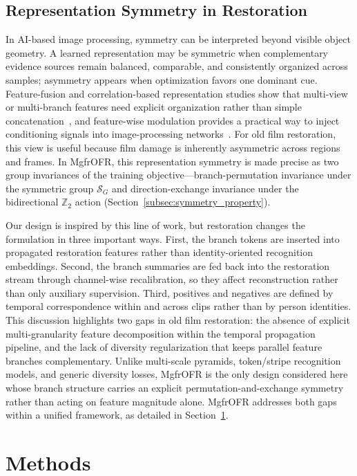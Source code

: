 \documentclass[symmetry,article,submit,pdftex,moreauthors]{Definitions/mdpi}
\begin{document}
\subsection{Representation Symmetry in Restoration}
\label{subsec:symmetry_ai}

In AI-based image processing, symmetry can be interpreted beyond visible object geometry. A learned representation may be symmetric when complementary evidence sources remain balanced, comparable, and consistently organized across samples; asymmetry appears when optimization favors one dominant cue. Feature-fusion and correlation-based representation studies show that multi-view or multi-branch features need explicit organization rather than simple concatenation~\cite{yu2021multiview_tensor_fusion,qian2020multiview_matrix_correlation}, and feature-wise modulation provides a practical way to inject conditioning signals into image-processing networks~\cite{perez2018film}. For old film restoration, this view is useful because film damage is inherently asymmetric across regions and frames. In MgfrOFR, this representation symmetry is made precise as two group invariances of the training objective---branch-permutation invariance under the symmetric group $\mathcal{S}_G$ and direction-exchange invariance under the bidirectional $\mathbb{Z}_2$ action (Section~\ref{subsec:symmetry_property}).

Our design is inspired by this line of work, but restoration changes the formulation in three important ways. First, the branch tokens are inserted into propagated restoration features rather than identity-oriented recognition embeddings. Second, the branch summaries are fed back into the restoration stream through channel-wise recalibration, so they affect reconstruction rather than only auxiliary supervision. Third, positives and negatives are defined by temporal correspondence within and across clips rather than by person identities. This discussion highlights two gaps in old film restoration: the absence of explicit multi-granularity feature decomposition within the temporal propagation pipeline, and the lack of diversity regularization that keeps parallel feature branches complementary. Unlike multi-scale pyramids, token/stripe recognition models, and generic diversity losses, MgfrOFR is the only design considered here whose branch structure carries an explicit permutation-and-exchange symmetry rather than acting on feature magnitude alone. MgfrOFR addresses both gaps within a unified framework, as detailed in Section~\ref{sec:method}.
\section{Methods}
\label{sec:method}
\end{document}

